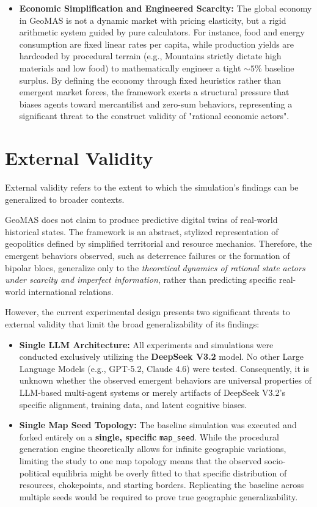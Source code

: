 \begin{itemize}
    \item \textbf{Economic Simplification and Engineered Scarcity:} The global economy in GeoMAS is not a dynamic market with pricing elasticity, but a rigid arithmetic system guided by pure calculators. For instance, food and energy consumption are fixed linear rates per capita, while production yields are hardcoded by procedural terrain (e.g., Mountains strictly dictate high materials and low food) to mathematically engineer a tight $\sim 5\%$ baseline surplus. By defining the economy through fixed heuristics rather than emergent market forces, the framework exerts a structural pressure that biases agents toward mercantilist and zero-sum behaviors, representing a significant threat to the construct validity of "rational economic actors".
\end{itemize}

\section{External Validity}
External validity refers to the extent to which the simulation's findings can be generalized to broader contexts.

GeoMAS does not claim to produce predictive digital twins of real-world historical states. The framework is an abstract, stylized representation of geopolitics defined by simplified territorial and resource mechanics. Therefore, the emergent behaviors observed, such as deterrence failures or the formation of bipolar blocs, generalize only to the \textit{theoretical dynamics of rational state actors under scarcity and imperfect information}, rather than predicting specific real-world international relations.

However, the current experimental design presents two significant threats to external validity that limit the broad generalizability of its findings:

\begin{itemize}
    \item \textbf{Single LLM Architecture:} All experiments and simulations were conducted exclusively utilizing the \textbf{DeepSeek V3.2} model. No other Large Language Models (e.g., GPT-5.2, Claude 4.6) were tested. Consequently, it is unknown whether the observed emergent behaviors are universal properties of LLM-based multi-agent systems or merely artifacts of DeepSeek V3.2's specific alignment, training data, and latent cognitive biases.
    \item \textbf{Single Map Seed Topology:} The baseline simulation was executed and forked entirely on a \textbf{single, specific} \texttt{map\_seed}. While the procedural generation engine theoretically allows for infinite geographic variations, limiting the study to one map topology means that the observed socio-political equilibria might be overly fitted to that specific distribution of resources, chokepoints, and starting borders. Replicating the baseline across multiple seeds would be required to prove true geographic generalizability.
\end{itemize}